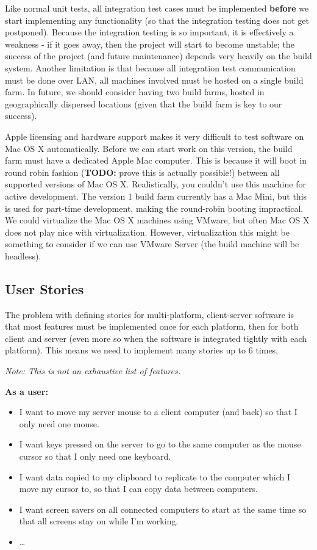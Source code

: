 Like normal unit tests, all integration test cases must be implemented 
\textbf{before} we start implementing any functionality (so that the integration
testing does not get postponed). Because the integration testing is so 
important, it is effectively a weakness - if it goes away, then the project will
start to become unstable; the success of the project (and future maintenance) 
depends very heavily on the build system. Another limitation is that because
all integration test communication must be done over LAN, all machines involved
must be hosted on a single build farm. In future, we should consider having two
build farms, hosted in geographically dispersed locations (given that the build
farm is key to our success).

Apple licensing and hardware support makes it very difficult to test software on
Mac OS X automatically. Before we can start work on this version, the build farm
must have a dedicated Apple Mac computer. This is because it will boot in round
robin fashion (\textbf{TODO:} prove this is actually possible!) between all 
supported versions of Mac OS X. Realistically, you couldn't use this machine 
for active development. The version 1 build farm currently has a Mac Mini, but
this is used for part-time development, making the round-robin booting
impractical. We could virtualize the Mac OS X machines using VMware, but often
Mac OS X does not play nice with virtualization. However, virtualization this 
might be something to consider if we can use VMware Server (the build machine
will be headless).

\subsection{User Stories}

The problem with defining stories for multi-platform, client-server software
is that most features must be implemented once for each platform, then for both
client and server (even more so when the software is integrated tightly with
each platform). This means we need to implement many stories up to 6 times.

\textit{Note: This is not an exhaustive list of features.}

\textbf{As a user:}

\begin{itemize}
  \item I want to move my server mouse to a client computer (and back) so that 
    I only need one mouse.
  \item I want keys pressed on the server to go to the same computer as the
    mouse cursor so that I only need one keyboard.
  \item I want data copied to my clipboard to replicate to the computer which
    I move my cursor to, so that I can copy data between computers.
  \item I want screen savers on all connected computers to start at the same
    time so that all screens stay on while I'm working.
  \item \ldots
\end{itemize}

